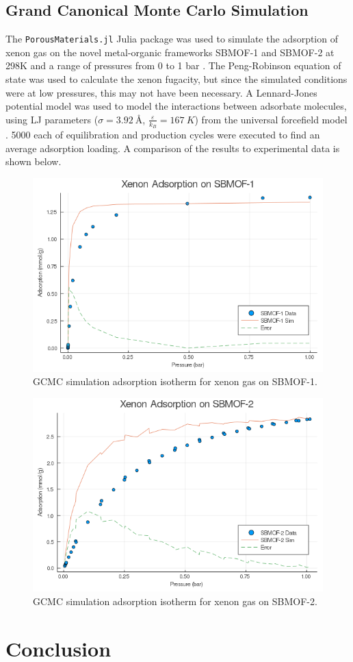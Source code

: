 \documentclass{article}
\begin{document}
\subsection{Grand Canonical Monte Carlo Simulation}
The \texttt{PorousMaterials.jl} Julia package was used to simulate the adsorption of xenon gas on the novel metal-organic frameworks SBMOF-1 and SBMOF-2 at 298K and a range of pressures from 0 to 1 bar \cite{porous-materials}.
The Peng-Robinson equation of state was used to calculate the xenon fugacity, but since the simulated conditions were at low pressures, this may not have been necessary. A Lennard-Jones potential model was used to model the interactions between adsorbate molecules, using LJ parameters ($\sigma=\SI{3.92}{\angstrom}$, $\frac{\varepsilon}{k_B} = \SI{167}{K}$) from the universal forcefield model \cite{uff}. 5000 each of equilibration and production cycles were executed to find an average adsorption loading. A comparison of the results to experimental data is shown below.
\begin{figure}[H]
    \centering
    \includegraphics[width=\textwidth]{fig/sbmof1-pengrob-error.png}
    \caption{GCMC simulation adsorption isotherm for xenon gas on SBMOF-1.}
    \label{fig:sbmof1-gcmc}
\end{figure}
\begin{figure}[H]
    \centering
    \includegraphics[width=\textwidth]{fig/sbmof2-pengrob-error.png}
    \caption{GCMC simulation adsorption isotherm for xenon gas on SBMOF-2.}
    \label{fig:sbmof2-gcmc}
\end{figure}
\section{Conclusion}

\printbibliography
\end{document}
